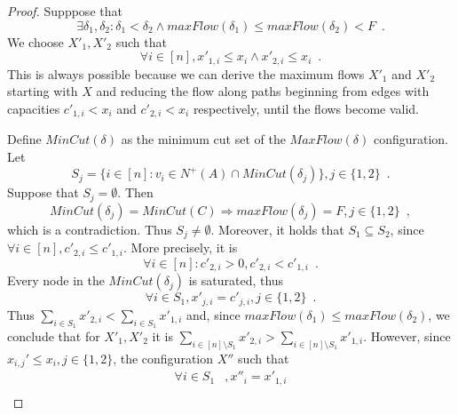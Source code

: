 \begin{proof}
  Supppose that
  \begin{equation*}
    \exists \delta_1, \delta_2 : \delta_1 < \delta_2 \wedge maxFlow\left(\delta_1\right) \leq maxFlow\left(\delta_2\right)
    < F \enspace.
  \end{equation*}
  We choose $X'_1, X'_2$ such that
  \begin{equation*}
    \forall i \in [n], x'_{1, i} \leq x_i \wedge x'_{2, i} \leq x_i \enspace.
  \end{equation*}
  This is always possible because we can derive the maximum flows $X'_1$ and $X'_2$ starting with $X$ and reducing the flow
  along paths beginning from edges with capacities $c'_{1,i} < x_i$ and $c'_{2,i} < x_i$ respectively, until the flows become
  valid.

  Define $MinCut\left(\delta\right)$ as the minimum cut set of the $MaxFlow\left(\delta\right)$ configuration. Let
  \begin{equation*}
    S_j = \{i \in [n] : v_i \in N^{+}\left(A\right) \cap MinCut\left(\delta_j\right)\}, j \in \{1, 2\} \enspace.
  \end{equation*}
  Suppose that $S_j = \emptyset$. Then
  \begin{equation*}
    MinCut\left(\delta_j\right) = MinCut\left(C\right) \Rightarrow maxFlow\left(\delta_j\right) = F, j \in \{1, 2\}
    \enspace,
  \end{equation*}
  which is a contradiction. Thus $S_j \neq \emptyset$.
  Moreover, it holds that $S_1 \subseteq S_2$, since $\forall i \in [n], c'_{2, i} \leq c'_{1, i}$. More precisely, it is
  \begin{equation*}
    \forall i \in [n] : c'_{2, i} > 0, c'_{2, i} < c'_{1, i} \enspace.
  \end{equation*}
  Every node in the $MinCut\left(\delta_j\right)$ is saturated, thus
  \begin{equation*}
    \forall i \in S_1, x'_{j, i} = c'_{j, i}, j \in \{1, 2\} \enspace.
  \end{equation*}
  Thus $\sum\limits_{i \in S_1} x'_{2, i} < \sum\limits_{i \in S_1}x'_{1, i}$ and, since $maxFlow(\delta_1) \leq
  maxFlow(\delta_2)$, we conclude that for $X'_1, X'_2$ it is $\sum\limits_{i \in [n] \setminus S_1}x'_{2, i} >
  \sum\limits_{i \in [n] \setminus S_1}x'_{1, i}$. However, since $x_{i,j}' \leq x_i, j \in \{1,2\}$, the configuration $X''$
  such that
  \begin{align*}
    \forall i \in S_1&, x''_i = x'_{1, i} \\

\end{align*}
\end{proof}
